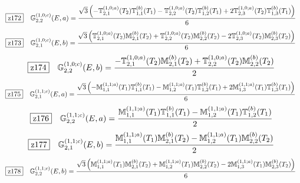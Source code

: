 \documentclass[fleqn,10pt,landscape]{jsarticle}
\begin{document}
\begin{dmath*}
\hspace*{3mm}\fbox{z172}\quad \mathbb{G}_{2,2}^{(1,0;c)}(E,a)=\frac{\sqrt{3} \left(- \mathbb{T}_{2,1}^{(1,0;a)}(T_{2}) \mathbb{T}_{1,1}^{(b)}(T_{1}) - \mathbb{T}_{2,2}^{(1,0;a)}(T_{2}) \mathbb{T}_{1,2}^{(b)}(T_{1}) + 2 \mathbb{T}_{2,3}^{(1,0;a)}(T_{2}) \mathbb{T}_{1,3}^{(b)}(T_{1})\right)}{6}
\end{dmath*}
\begin{dmath*}
\hspace*{3mm}\fbox{z173}\quad \mathbb{G}_{2,1}^{(1,0;c)}(E,b)=\frac{\sqrt{3} \left(\mathbb{T}_{2,1}^{(1,0;a)}(T_{2}) \mathbb{M}_{2,1}^{(b)}(T_{2}) + \mathbb{T}_{2,2}^{(1,0;a)}(T_{2}) \mathbb{M}_{2,2}^{(b)}(T_{2}) - 2 \mathbb{T}_{2,3}^{(1,0;a)}(T_{2}) \mathbb{M}_{2,3}^{(b)}(T_{2})\right)}{6}
\end{dmath*}
\begin{dmath*}
\hspace*{3mm}\fbox{z174}\quad \mathbb{G}_{2,2}^{(1,0;c)}(E,b)=\frac{- \mathbb{T}_{2,1}^{(1,0;a)}(T_{2}) \mathbb{M}_{2,1}^{(b)}(T_{2}) + \mathbb{T}_{2,2}^{(1,0;a)}(T_{2}) \mathbb{M}_{2,2}^{(b)}(T_{2})}{2}
\end{dmath*}
\begin{dmath*}
\hspace*{3mm}\fbox{z175}\quad \mathbb{G}_{2,1}^{(1,1;c)}(E,a)=\frac{\sqrt{3} \left(- \mathbb{M}_{1,1}^{(1,1;a)}(T_{1}) \mathbb{T}_{1,1}^{(b)}(T_{1}) - \mathbb{M}_{1,2}^{(1,1;a)}(T_{1}) \mathbb{T}_{1,2}^{(b)}(T_{1}) + 2 \mathbb{M}_{1,3}^{(1,1;a)}(T_{1}) \mathbb{T}_{1,3}^{(b)}(T_{1})\right)}{6}
\end{dmath*}
\begin{dmath*}
\hspace*{3mm}\fbox{z176}\quad \mathbb{G}_{2,2}^{(1,1;c)}(E,a)=\frac{\mathbb{M}_{1,1}^{(1,1;a)}(T_{1}) \mathbb{T}_{1,1}^{(b)}(T_{1}) - \mathbb{M}_{1,2}^{(1,1;a)}(T_{1}) \mathbb{T}_{1,2}^{(b)}(T_{1})}{2}
\end{dmath*}
\begin{dmath*}
\hspace*{3mm}\fbox{z177}\quad \mathbb{G}_{2,1}^{(1,1;c)}(E,b)=\frac{\mathbb{M}_{1,1}^{(1,1;a)}(T_{1}) \mathbb{M}_{2,1}^{(b)}(T_{2}) - \mathbb{M}_{1,2}^{(1,1;a)}(T_{1}) \mathbb{M}_{2,2}^{(b)}(T_{2})}{2}
\end{dmath*}
\begin{dmath*}
\hspace*{3mm}\fbox{z178}\quad \mathbb{G}_{2,2}^{(1,1;c)}(E,b)=\frac{\sqrt{3} \left(\mathbb{M}_{1,1}^{(1,1;a)}(T_{1}) \mathbb{M}_{2,1}^{(b)}(T_{2}) + \mathbb{M}_{1,2}^{(1,1;a)}(T_{1}) \mathbb{M}_{2,2}^{(b)}(T_{2}) - 2 \mathbb{M}_{1,3}^{(1,1;a)}(T_{1}) \mathbb{M}_{2,3}^{(b)}(T_{2})\right)}{6}
\end{dmath*}
\end{document}
